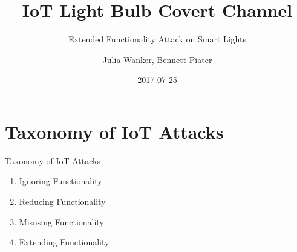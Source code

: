 \documentclass[11pt,t,usepdftitle=false,aspectratio=169]{beamer}
\title[IoT Light Bulb Attack]{IoT Light Bulb Covert Channel}
\subtitle{Extended Functionality Attack on Smart Lights}
\author[Julia Wanker \& Bennett Piater]{Julia Wanker, Bennett Piater}
\date{2017-07-25}
\begin{document}



\section{Taxonomy of IoT Attacks}
\begin{frame}{Taxonomy of IoT Attacks}
	\begin{enumerate}
		\item Ignoring Functionality
		\item Reducing Functionality
		\item Misusing Functionality
		\item Extending Functionality
	\end{enumerate}
\end{frame}
\end{document}

